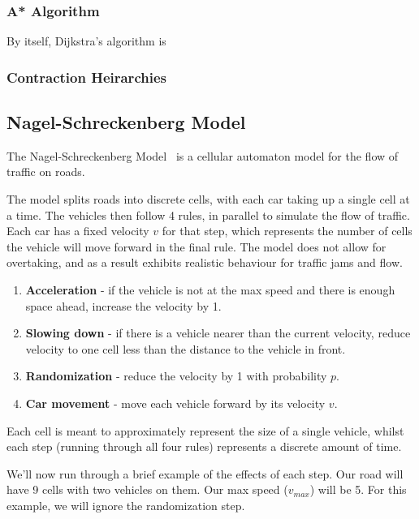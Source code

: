\documentclass[ draft,
                    author={Alexander Hill},
                supervisor={Dr. Benjamin Sach},
                    degree={MEng},
                     title={MARMOSET: Multi Agent Real-time Multi-core Online
                     Simulation for Efficient Transportation},
                  subtitle={},
                      type={research},
                      year={2016} ]{dissertation}
\begin{document}
\subsubsection{A* Algorithm}

By itself, Dijkstra's algorithm is

\subsubsection{Contraction Heirarchies}

\subsection{Nagel-Schreckenberg Model}

The Nagel-Schreckenberg Model~\cite{nagel} is a cellular automaton model for the flow of
traffic on roads.

The model splits roads into discrete cells, with each car taking up a single
cell at a time. The vehicles then follow 4 rules, in parallel to simulate the
flow of traffic. Each car has a fixed velocity $v$ for that step, which
represents the number of cells the vehicle will move forward in the final rule.
The model does not allow for overtaking, and as a result exhibits realistic
behaviour for traffic jams and flow.

\begin{enumerate}
    \item \textbf{Acceleration} - if the vehicle is not at the max speed and
        there is enough space ahead, increase the velocity by 1.
    \item \textbf{Slowing down} - if there is a vehicle nearer than the current
        velocity, reduce velocity to one cell less than the distance to the
        vehicle in front.
    \item \textbf{Randomization} - reduce the velocity by 1 with probability
        $p$.
    \item \textbf{Car movement} - move each vehicle forward by its velocity $v$.
\end{enumerate}

Each cell is meant to approximately represent the size of a single vehicle,
whilst each step (running through all four rules) represents a discrete amount
of time.

We'll now run through a brief example of the effects of each step. Our road will
have 9 cells with two vehicles on them. Our max speed ($v_{max}$) will be 5.
For this example, we will ignore the randomization step.
\end{document}
